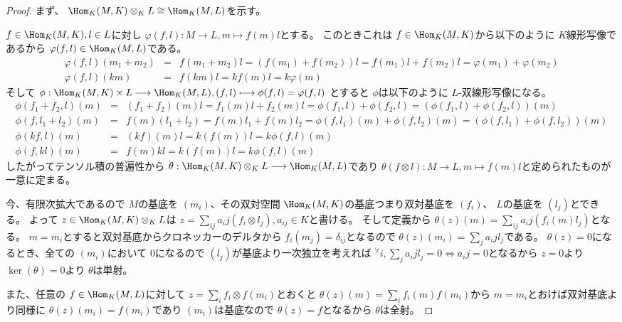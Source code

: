 \documentclass[../master_galois_theory]{subfiles}
\begin{document}
\begin{proof}
  まず、 $\Hom_K (M,K) \otimes_K L \cong \Hom_K (M,L)$を示す。

  $f \in \Hom_K(M,K) , l \in L$に対し $\varphi(f,l) : M \longrightarrow L , m \longmapsto f(m)l$とする。
  このときこれは $f \in \Hom_K(M,K)$から以下のように $K$線形写像であるから $\varphi(f,l) \in \Hom_K(M,L)$である。
  \begin{eqnarray*}
    \varphi (f,l) (m_1 + m_2) & = & f(m_1 + m_2)l = (f(m_1) + f(m_2))l = f(m_1)l + f(m_2)l = \varphi (m_1) + \varphi (m_2) \\
    \varphi (f,l) (km) & = & f(km)l = kf(m)l = k \varphi(m)
  \end{eqnarray*}
  そして $\phi : \Hom_K(M,K) \times L \longrightarrow \Hom_K(M,L) , (f,l) \longmapsto \phi(f,l) = \varphi(f,l)$
  とすると $\phi$は以下のように $L$-双線形写像になる。
  \begin{eqnarray*}
    \phi(f_1 + f_2 , l) (m) & = & (f_1 + f_2)(m)l = f_1(m)l + f_2(m)l = \phi(f_1,l) + \phi(f_2,l) = (\phi(f_1,l) + \phi(f_2,l))(m) \\
    \phi(f , l_1 + l_2) (m) & = & f(m)(l_1 + l_2) = f(m)l_1 + f(m)l_2 = \phi(f,l_1)(m) + \phi(f,l_2)(m) = (\phi(f,l_1) + \phi(f,l_2))(m) \\
    \phi(kf , l) (m) & = & (kf)(m)l = k(f(m))l = k \phi(f,l)(m) \\
    \phi(f,kl) (m) & = & f(m)kl = k(f(m))l = k \phi(f,l)(m)
  \end{eqnarray*}
  したがってテンソル積の普遍性から
  $\theta : \Hom_K (M,K) \otimes_K L \longrightarrow \Hom_K(M,L)$であり
  $\theta (f \otimes l) : M \longrightarrow L , m \longmapsto f(m)l$と定められたものが一意に定まる。

  今、有限次拡大であるので $M$の基底を $(m_i)$、その双対空間 $\Hom_K(M,K)$の基底つまり双対基底を $(f_i)$、 $L$の基底を $(l_j)$とできる。
  よって $z \in \Hom_K(M,K) \otimes_K L$は $z = \sum_{ij} a_ij (f_i \otimes l_j) , a_{ij} \in K$と書ける。
  そして定義から $\theta(z)(m) = \sum_{ij} a_ij (f_i (m) l_j)$となる。
  $m = m_i$とすると双対基底からクロネッカーのデルタから $f_i(m_j) = \delta_{ij}$となるので $\theta(z)(m_i) = \sum_j a_ij l_j$である。
  $\theta (z) = 0$になるとき、全ての $(m_i)$において $0$になるので $(l_j)$が基底より一次独立を考えれば ${}^\forall i , \sum_j a_ij l_j = 0 \Leftrightarrow a_ij = 0$となるから $z = 0$より $\ker (\theta) = 0$より $\theta$は単射。

  また、任意の $f \in \Hom_K(M,L)$に対して $z = \sum_i f_i \otimes f(m_i) $とおくと $\theta (z)(m) = \sum_i f_i (m) f(m_i)$から $m = m_i$とおけば双対基底より同様に $\theta (z)(m_i) = f(m_i)$であり $(m_i)$は基底なので $\theta (z) = f$となるから $\theta$は全射。


\end{proof}
\end{document}
